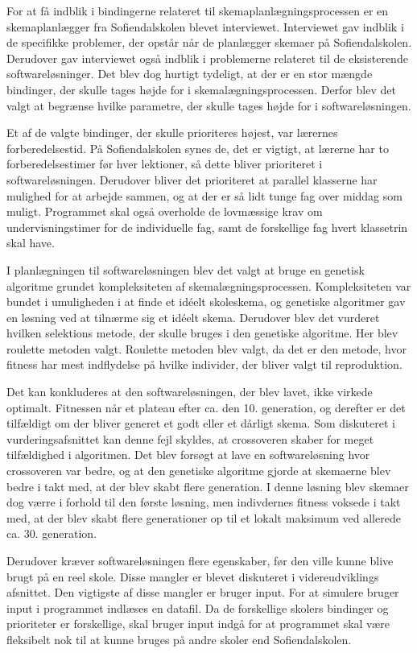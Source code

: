 For at få indblik i bindingerne relateret til skemaplanlægningsprocessen er en skemaplanlægger fra Sofiendalskolen blevet interviewet. Interviewet gav indblik i de specifikke problemer, der opstår når de planlægger skemaer på Sofiendalskolen. Derudover gav interviewet også indblik i problemerne relateret til de eksisterende softwareløsninger. Det blev dog hurtigt tydeligt, at der er en stor mængde bindinger, der skulle tages højde for i skemalægningsprocessen. Derfor blev det valgt at begrænse hvilke parametre, der skulle tages højde for i softwareløsningen. 

Et af de valgte bindinger, der skulle prioriteres højest, var lærernes forberedelsestid. På Sofiendalskolen synes de, det er vigtigt, at lærerne har to forberedelsestimer før hver lektioner, så dette bliver prioriteret i softwareløsningen. Derudover bliver det prioriteret at parallel klasserne har mulighed for at arbejde sammen, og at der er så lidt tunge fag over middag som muligt. Programmet skal også overholde de lovmæssige krav om undervisningstimer for de individuelle fag, samt de forskellige fag hvert klassetrin skal have. 

I planlægningen til softwareløsningen blev det valgt at bruge en genetisk algoritme grundet kompleksiteten af skemalægningsprocessen. Kompleksiteten var bundet i umuligheden i at finde et idéelt skoleskema, og genetiske algoritmer gav en løsning ved at tilnærme sig et idéelt skema. Derudover blev det vurderet hvilken selektions metode, der skulle bruges i den genetiske algoritme. Her blev roulette metoden valgt. Roulette metoden blev valgt, da det er den metode, hvor fitness har mest indflydelse på hvilke individer, der bliver valgt til reproduktion. 

Det kan konkluderes at den softwareløsningen, der blev lavet, ikke virkede optimalt. Fitnessen når et plateau efter ca. den 10. generation, og derefter er det tilfældigt om der bliver generet et godt eller et dårligt skema. Som diskuteret i vurderingsafsnittet kan denne fejl skyldes, at crossoveren skaber for meget tilfældighed i algoritmen. Det blev forsøgt at lave en softwareløsning hvor crossoveren var bedre, og at den genetiske algoritme gjorde at skemaerne blev bedre i takt med, at der blev skabt flere generation. I denne løsning blev skemaer dog værre i forhold til den første løsning, men indivdernes fitness voksede i takt med, at der blev skabt flere generationer op til et lokalt maksimum ved allerede ca. 30. generation.

Derudover kræver softwareløsningen flere egenskaber, før den ville kunne blive brugt på en reel skole. Disse mangler er blevet diskuteret i videreudviklings afsnittet. Den vigtigste af disse mangler er bruger input. For at simulere bruger input i programmet indlæses en datafil. Da de forskellige skolers bindinger og prioriteter er forskellige, skal  bruger input indgå for at programmet skal være fleksibelt nok til at kunne bruges på andre skoler end Sofiendalskolen.
